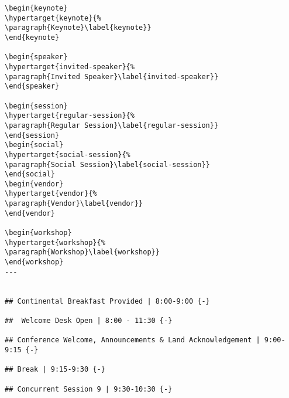 \documentclass[
]{book}
\begin{document}
\begin{verbatim}
\begin{keynote}
\hypertarget{keynote}{%
\paragraph{Keynote}\label{keynote}}
\end{keynote}

\begin{speaker}
\hypertarget{invited-speaker}{%
\paragraph{Invited Speaker}\label{invited-speaker}}
\end{speaker}

\begin{session}
\hypertarget{regular-session}{%
\paragraph{Regular Session}\label{regular-session}}
\end{session}
\begin{social}
\hypertarget{social-session}{%
\paragraph{Social Session}\label{social-session}}
\end{social}
\begin{vendor}
\hypertarget{vendor}{%
\paragraph{Vendor}\label{vendor}}
\end{vendor}

\begin{workshop}
\hypertarget{workshop}{%
\paragraph{Workshop}\label{workshop}}
\end{workshop}
--- 


## Continental Breakfast Provided | 8:00-9:00 {-}

##  Welcome Desk Open | 8:00 - 11:30 {-}

## Conference Welcome, Announcements & Land Acknowledgement | 9:00-9:15 {-}

## Break | 9:15-9:30 {-}

## Concurrent Session 9 | 9:30-10:30 {-}


\end{verbatim}
\end{document}
